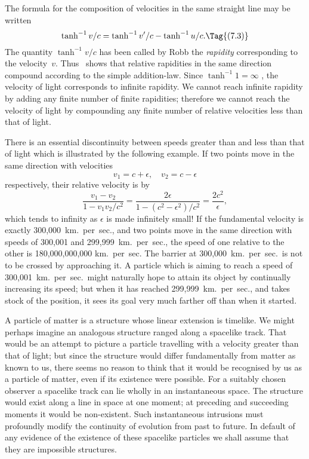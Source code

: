 \documentclass[12pt]{book}
\begin{document}
The formula  for the composition of velocities in the same straight
%
%
line may be written
\[
\tanh^{-1} v/c = \tanh^{-1} v'/c - \tanh^{-1} u/c.
\Tag{(7.3)}
\]
The quantity $\tanh^{-1} v/c$ has been called by Robb the \emph{rapidity} corresponding
%
to the velocity~$v$. Thus ~shows that relative rapidities in the same direction
compound according to the simple addition-law. Since $\tanh^{-1} 1 = \infty$ , the
velocity of light corresponds to infinite rapidity. We cannot reach infinite
rapidity by adding any finite number of finite rapidities; therefore we cannot
reach the velocity of light by compounding any finite number of relative
velocities less than that of light.

There is an essential discontinuity between speeds greater than and less
than that of light which is illustrated by the following example. If two points
%
move in the same direction with velocities
\[
v_{1} = c + \epsilon,\quad
v_{2} = c - \epsilon
\]
respectively, their relative velocity is by~
\[
\frac{v_{1} - v_{2}}{1 - v_{1}v_{2}/c^{2}}
= \frac{2\epsilon}{1 - (c^{2} - \epsilon^{2})/c^{2}}
= \frac{2c^{2}}{\epsilon},
\]
which tends to infinity as $\epsilon$ is made infinitely small! If the fundamental
velocity is exactly 300,000~km.\ per~sec., and two points move in the same
direction with speeds of 300,001 and 299,999~km.\ per~sec., the speed of one
relative to the other is 180,000,000,000 km.\ per~sec. The barrier at 300,000~km.\
per~sec.\ is not to be crossed by approaching it. A particle which is aiming to
reach a speed of 300,001~km.\ per~sec.\ might naturally hope to attain its object
by continually increasing its speed; but when it has reached 299,999~km.\ per~sec.,
and takes stock of the position, it sees its goal very much farther off than
when it started.

A particle of matter is a structure whose linear extension is timelike. We
might perhaps imagine an analogous structure ranged along a spacelike track.
That would be an attempt to picture a particle travelling with a velocity
greater than that of light; but since the structure would differ fundamentally
from matter as known to us, there seems no reason to think that it would be
recognised by us as a particle of matter, even if its existence were possible.
For a suitably chosen observer a spacelike track can lie wholly in an instantaneous
space. The structure would exist along a line in space at one moment;
at preceding and succeeding moments it would be non-existent. Such instantaneous
intrusions must profoundly modify the continuity of evolution from
past to future. In default of any evidence of the existence of these spacelike
particles we shall assume that they are impossible structures.
\end{document}
